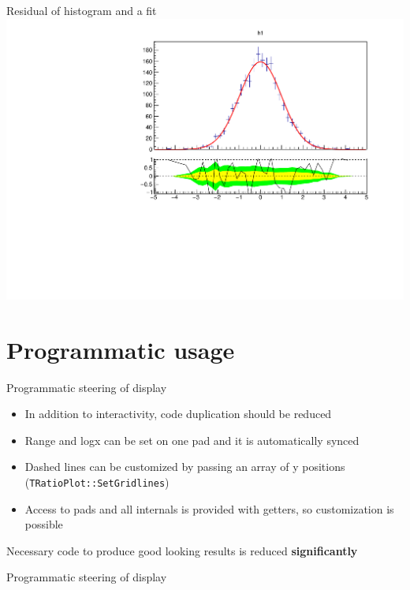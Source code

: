 \documentclass{beamer}
\begin{document}
\begin{frame}{\insertsection}
  \centering
  Residual of histogram and a fit
  \includegraphics[width=0.9\linewidth]{assets/single.pdf} 
\end{frame}

\section{Programmatic usage}

\begin{frame}{Programmatic steering of display}
    \begin{itemize}
      \item In addition to interactivity, code duplication should be reduced
      \item Range and logx can be set on one pad and it is automatically synced
      \item Dashed lines can be customized by passing an array of y positions (\texttt{TRatioPlot::SetGridlines})
      \item Access to pads and all internals is provided with getters, so customization is possible
    \end{itemize}
    Necessary code to produce good looking results is reduced \bf{significantly}
\end{frame}

\begin{frame}[t]{Programmatic steering of display}
\end{frame}
\end{document}

